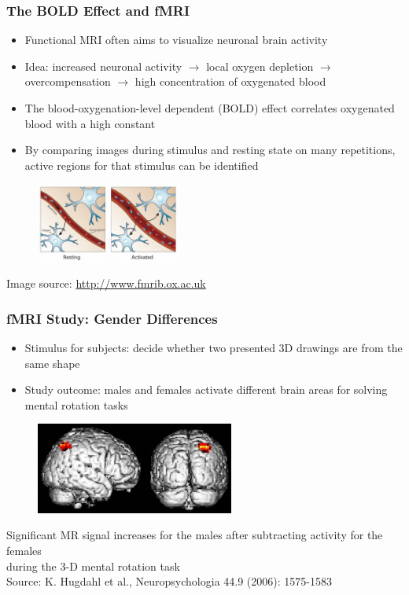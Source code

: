 \begin{frame}
	\frametitle{The BOLD Effect and fMRI}

		\begin{itemize}
		\item Functional MRI often aims to visualize neuronal brain activity
		\item Idea: increased neuronal activity $\rightarrow$ local oxygen depletion $\rightarrow$ overcompensation $\rightarrow$ high concentration of oxygenated blood
		\item The blood-oxygenation-level dependent (BOLD) effect correlates oxygenated blood with a high \inhomogtime{} constant
		\item By comparing images during stimulus and resting state on many repetitions, active regions for that stimulus can be identified
		\end{itemize}
		
				\begin{figure}
	\includegraphics[height=2.6cm]{images/fmri_bold.jpg}
	\end{figure}
	\vspace{-1ex}
	\centering
\fontsize{7.5}{8.4}\selectfont
Image source: \url{http://www.fmrib.ox.ac.uk}
	
\end{frame}

\begin{frame}
	\frametitle{fMRI Study: Gender Differences}
	
			\begin{itemize}
		\item Stimulus for subjects: decide whether two presented 3D drawings are from the same shape
		\item Study outcome: males and females activate different brain areas for solving mental rotation tasks
		\end{itemize}
	
	\begin{figure}
	\includegraphics[height=3cm]{images/fmri_men_women.png}
	\end{figure}
	
\centering
\fontsize{8}{8.4}\selectfont
Significant MR signal increases for the males after subtracting activity for the females \\during the 3-D mental rotation task\\ Source: K. Hugdahl et al., Neuropsychologia 44.9 (2006): 1575-1583
\end{frame}




